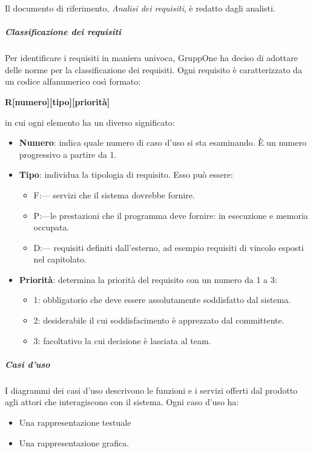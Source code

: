 \documentclass[../norme-di-progetto.tex]{subfiles}
\begin{document}
Il documento di riferimento, \textit{Analisi dei requisiti}, è redatto dagli analisti.

\subparagraph{Classificazione dei requisiti}%
\label{subp:classificazione_dei_requisiti}

Per identificare i requisiti in maniera univoca, GruppOne ha deciso di adottare delle norme per la classificazione dei requisiti.
Ogni requisito è caratterizzato da un codice alfanumerico così formato:
\begin{center}
  \textbf{R[numero][tipo][priorità]}
\end{center}
in cui ogni elemento ha un diverso significato:
\begin{itemize}
  \item \textbf{Numero}: indica quale numero di caso d'uso si sta esaminando. È un numero progressivo a partire da 1.
  \item \textbf{Tipo}: individua la tipologia di requisito. Esso può essere:
        \begin{itemize}
          \item F:\@funzionale --- \@indica servizi che il sistema dovrebbe fornire.
          \item P:\@prestazionale ---\@indica le prestazioni che il programma deve fornire:  in esecuzione e memoria occupata.
          \item D:\@dichiarativo --- \@indica requisiti definiti dall'esterno, ad esempio requisiti di vincolo esposti nel capitolato.
        \end{itemize}
  \item \textbf{Priorità}: determina la priorità del requisito con un numero da 1 a 3:
        \begin{itemize}
          \item 1: \@requisito obbligatorio che deve essere assolutamente soddisfatto dal sistema.
          \item 2: \@requisito desiderabile il cui soddisfacimento è apprezzato dal committente.
          \item 3: \@requisito facoltativo la cui decisione è lasciata al team.
        \end{itemize}
\end{itemize}
\subparagraph{Casi d'uso}%
\label{subp:casi_d'uso}
I diagrammi dei casi d'uso descrivono le funzioni e i servizi offerti dal prodotto agli attori che interagiscono con il sistema. Ogni caso d'uso ha:

\begin{itemize}
  \item Una rappresentazione testuale
  \item Una rappresentazione grafica.
\end{itemize}
\end{document}
